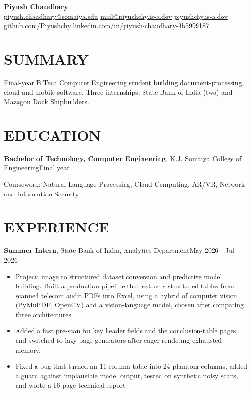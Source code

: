 \documentclass[10pt,letterpaper]{article}
\begin{document}
\begin{center}{\LARGE\bfseries Piyush Chaudhary}\\[3pt]
\href{mailto:piyush.chaudhary@somaiya.edu}{piyush.chaudhary@somaiya.edu} \textbar{} \href{mailto:mail@piyushchy.is-a.dev}{mail@piyushchy.is-a.dev} \textbar{} \href{https://piyushchy.is-a.dev/}{piyushchy.is-a.dev} \textbar{} \href{https://github.com/Piyushchy}{github.com/Piyushchy} \textbar{} \href{https://www.linkedin.com/in/piyush-chaudhary-9b5999187/}{linkedin.com/in/piyush-chaudhary-9b5999187}
\end{center}

\section*{SUMMARY}
Final-year B.Tech Computer Engineering student building document-processing, cloud and mobile software. Three internships: State Bank of India (two) and Mazagon Dock Shipbuilders.

\section*{EDUCATION}
\noindent\textbf{Bachelor of Technology, Computer Engineering}, K.J. Somaiya College of Engineering\hfill Final year\par
Coursework: Natural Language Processing, Cloud Computing, AR/VR, Network and Information Security\par

\section*{EXPERIENCE}
\noindent\textbf{Summer Intern}, State Bank of India, Analytics Department\hfill May 2026 - Jul 2026\par
\begin{itemize}
  \item Project: image to structured dataset conversion and predictive model building. Built a production pipeline that extracts structured tables from scanned telecom audit PDFs into Excel, using a hybrid of computer vision (PyMuPDF, OpenCV) and a vision-language model, chosen after comparing three architectures.
  \item Added a fast pre-scan for key header fields and the conclusion-table pages, and switched to lazy page generators after eager rendering exhausted memory.
  \item Fixed a bug that turned an 11-column table into 24 phantom columns, added a guard against implausible model output, tested on synthetic noisy scans, and wrote a 16-page technical report.
\end{itemize}
\end{document}
